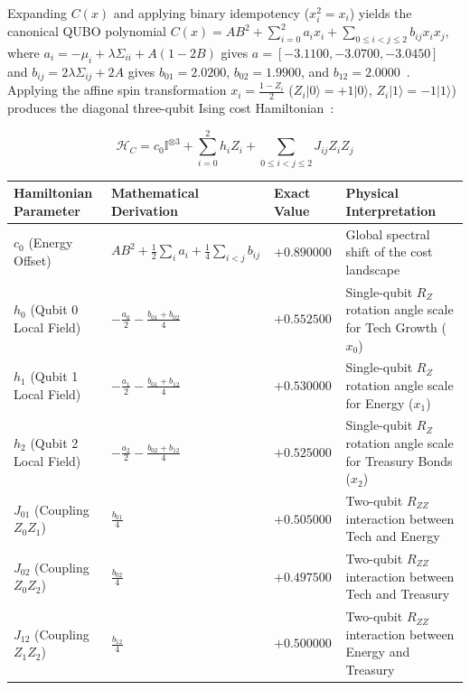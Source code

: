 \documentclass[10pt,letterpaper]{article}
\begin{document}
Expanding $C(x)$ and applying binary idempotency ($x_i^2 = x_i$) yields the canonical QUBO polynomial $C(x) = A B^2 + \sum_{i=0}^{2} a_i x_i + \sum_{0 \le i < j \le 2} b_{ij} x_i x_j$, where $a_i = -\mu_i + \lambda \Sigma_{ii} + A(1 - 2B)$ gives $a = [-3.1100, -3.0700, -3.0450]$ and $b_{ij} = 2\lambda \Sigma_{ij} + 2A$ gives $b_{01} = 2.0200$, $b_{02} = 1.9900$, and $b_{12} = 2.0000$~\cite{qfx_doc}. Applying the affine spin transformation $x_i = \frac{1 - Z_i}{2}$ ($Z_i \vert 0 \rangle = +1\vert 0 \rangle$, $Z_i \vert 1 \rangle = -1\vert 1 \rangle$) produces the diagonal three-qubit Ising cost Hamiltonian~\cite{qfx_doc}:

\begin{equation}
\mathcal{H}_C = c_0 \mathbb{I}^{\otimes 3} + \sum_{i=0}^{2} h_i Z_i + \sum_{0 \le i < j \le 2} J_{ij} Z_i Z_j
\end{equation}

\vspace{6pt}\noindent\begin{minipage}{\textwidth}
\centering
{}
\vspace{2pt}
\footnotesize
\begin{tabularx}{\textwidth}{L{3.4cm} L{4.2cm} R{2.4cm} Y}
\toprule
\textbf{Hamiltonian Parameter} & \textbf{Mathematical Derivation} & \textbf{Exact Value} & \textbf{Physical Interpretation} \\
\midrule
$c_0$ (Energy Offset) & $A B^2 + \frac{1}{2}\sum_{i} a_i + \frac{1}{4}\sum_{i<j} b_{ij}$ & $+0.890000$ & Global spectral shift of the cost landscape \\
$h_0$ (Qubit 0 Local Field) & $-\frac{a_0}{2} - \frac{b_{01} + b_{02}}{4}$ & $+0.552500$ & Single-qubit $R_Z$ rotation angle scale for Tech Growth ($x_0$) \\
$h_1$ (Qubit 1 Local Field) & $-\frac{a_1}{2} - \frac{b_{01} + b_{12}}{4}$ & $+0.530000$ & Single-qubit $R_Z$ rotation angle scale for Energy ($x_1$) \\
$h_2$ (Qubit 2 Local Field) & $-\frac{a_2}{2} - \frac{b_{02} + b_{12}}{4}$ & $+0.525000$ & Single-qubit $R_Z$ rotation angle scale for Treasury Bonds ($x_2$) \\
$J_{01}$ (Coupling $Z_0 Z_1$) & $\frac{b_{01}}{4}$ & $+0.505000$ & Two-qubit $R_{ZZ}$ interaction between Tech and Energy \\
$J_{02}$ (Coupling $Z_0 Z_2$) & $\frac{b_{02}}{4}$ & $+0.497500$ & Two-qubit $R_{ZZ}$ interaction between Tech and Treasury \\
$J_{12}$ (Coupling $Z_1 Z_2$) & $\frac{b_{12}}{4}$ & $+0.500000$ & Two-qubit $R_{ZZ}$ interaction between Energy and Treasury \\
\bottomrule
\end{tabularx}
\end{minipage}\vspace{6pt}
\end{document}
